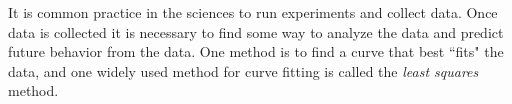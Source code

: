  \label{chap:R_n}

\vspace*{-17 pt}

\vspace*{13 pt}

\label{sec:appl_romania}

It is common practice in the sciences to run experiments and collect data. Once data is collected it is necessary to find some way to analyze the data and predict future behavior from the data. One method is to find a curve that best ``fits" the data, and one widely used method for curve fitting is called the \emph{least squares} method.

